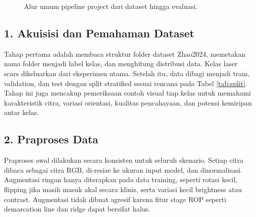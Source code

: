 \documentclass[12pt,a4paper]{article}
\begin{document}
\begin{figure}[h]
\centering
{}
\caption{Alur umum pipeline project dari dataset hingga evaluasi.}
\label{fig:pipeline}
\end{figure}

\subsection*{1. Akuisisi dan Pemahaman Dataset}

Tahap pertama adalah membaca struktur folder dataset Zhao2024, memetakan nama folder menjadi label kelas, dan menghitung distribusi data. Kelas laser scars dikeluarkan dari eksperimen utama. Setelah itu, data dibagi menjadi train, validation, dan test dengan split stratified sesuai rencana pada Tabel \ref{tab:split}. Tahap ini juga mencakup pemeriksaan contoh visual tiap kelas untuk memahami karakteristik citra, variasi orientasi, kualitas pencahayaan, dan potensi kemiripan antar kelas.

\subsection*{2. Praproses Data}

Praproses awal dilakukan secara konsisten untuk seluruh skenario. Setiap citra dibaca sebagai citra RGB, di-resize ke ukuran input model, dan dinormalisasi. Augmentasi ringan hanya diterapkan pada data training, seperti rotasi kecil, flipping jika masih masuk akal secara klinis, serta variasi kecil brightness atau contrast. Augmentasi tidak dibuat agresif karena fitur stage ROP seperti demarcation line dan ridge dapat bersifat halus.
\end{document}
